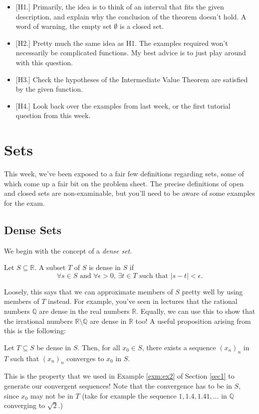 \documentclass[
  17pt,
  a4paper]{extarticle}
\providecommand{\tightlist}{%
  \setlength{\itemsep}{0pt}\setlength{\parskip}{0pt}}
\theoremstyle{plain}
\theoremstyle{plain}
\theoremstyle{plain}
\theoremstyle{plain}
\theoremstyle{plain}
\theoremstyle{definition}
\theoremstyle{definition}
\theoremstyle{definition}
\theoremstyle{remark}
\let\BeginKnitrBlock\begin \let\EndKnitrBlock\end
\renewcommand{\;}{\,}
\begin{document}
\begin{itemize}
\tightlist
\item
  {[}H1.{]} Primarily, the idea is to think of an interval that fits the given description, and explain why the conclusion of the theorem doesn't hold. A word of warning, the empty set \(\emptyset\) is a closed set.
\item
  {[}H2.{]} Pretty much the same idea as H1. The examples required won't necessarily be complicated functions. My best advice is to just play around with this question.
\item
  {[}H3.{]} Check the hypotheses of the Intermediate Value Theorem are satisfied by the given function.
\item
  {[}H4.{]} Look back over the examples from last week, or the first tutorial question from this week.
\end{itemize}

\hypertarget{sets}{%
\section{Sets}\label{sets}}

This week, we've been exposed to a fair few definitions regarding sets, some of which come up a fair bit on the problem sheet. The precise definitions of open and closed sets are non-examinable, but you'll need to be aware of some examples for the exam.

\hypertarget{dense-sets}{%
\subsection{Dense Sets}\label{dense-sets}}

We begin with the concept of a \emph{dense set}.
\BeginKnitrBlock{definition}[Dense Set]
{\label{def:def3} }Let \(S \subseteq \mathbb{R}\). A subset \(T\) of \(S\) is dense in \(S\) if \[\forall s \in S \;\;\text{and}\;\; \forall \epsilon > 0,\; \exists t \in T \;\; \text{such that}\;\; \lvert s - t \rvert < \epsilon.\]
\EndKnitrBlock{definition}
Loosely, this says that we can approximate members of \(S\) pretty well by using members of \(T\) instead. For example, you've seen in lectures that the rational numbers \(\mathbb{Q}\) are dense in the real numbers \(\mathbb{R}\). Equally, we can use this to show that the irrational numbers \(\mathbb{R}\setminus\mathbb{Q}\) are dense in \(\mathbb{R}\) too! A useful proposition arising from this is the following:

\BeginKnitrBlock{proposition}
{\label{prp:prop1} }Let \(T \subseteq S\) be dense in \(S\). Then, for all \(x_0 \in S\), there exists a sequence \((x_n)_n\) in \(T\) such that \((x_n)_n\) converges to \(x_0\) in \(S\).
\EndKnitrBlock{proposition}
This is the property that we used in Example \ref{exm:ex2} of Section \ref{sec1} to generate our convergent sequences! Note that the convergence has to be in \(S\), since \(x_0\) may not be in \(T\) (take for example the sequence \(1, 1.4, 1.41,\ldots\) in \(\mathbb{Q}\) converging to \(\sqrt{2}\).)
\end{document}
